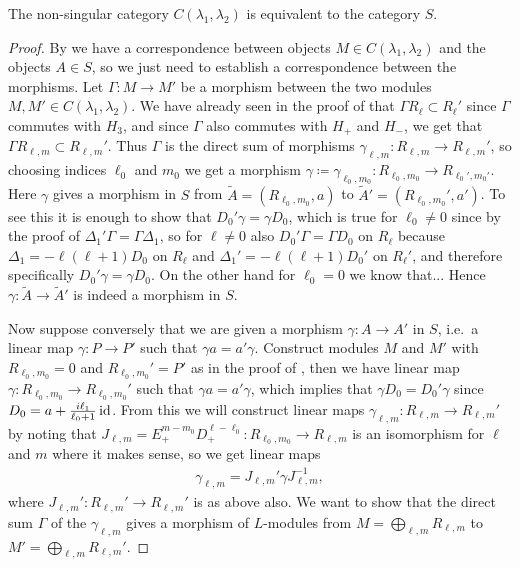 \begin{theorem}
  The non-singular category $C(\lambda_1,\lambda_2)$ is equivalent to the category $S$.
\end{theorem}
\begin{proof}
  By  we have a correspondence between objects $M\in C(\lambda_1,\lambda_2)$ and the objects $A\in S$, so we just need to establish a correspondence between the morphisms. Let $\Gamma\colon M\to M'$ be a morphism between the two modules $M,M'\in C(\lambda_1,\lambda_2)$. We have already seen in the proof of  that $\Gamma R_\ell\subset R_\ell'$ since $\Gamma$ commutes with $H_3$, and since $\Gamma$ also commutes with $H_+$ and $H_-$, we get that $\Gamma R_{\ell,m}\subset R_{\ell,m}'$. Thus $\Gamma$ is the direct sum of morphisms $\gamma_{\ell,m}\colon R_{\ell,m}\to R_{\ell,m}'$, so choosing indices $\ell_0$ and $m_0$ we get a morphism $\gamma\coloneqq \gamma_{\ell_0,m_0}\colon R_{\ell_0,m_0}\to R_{\ell_0',m_0'}$. Here $\gamma$ gives a morphism in $S$ from $\widetilde{A}=(R_{\ell_0,m_0},a)$ to $\widetilde{A}'=(R_{\ell_0,m_0}',a')$. To see this it is enough to show that $D_0'\gamma = \gamma D_0$, which is true for $\ell_0\neq0$ since by the proof of  $\Delta_1'\Gamma=\Gamma\Delta_1$, so for $\ell\neq 0$ also $D_0'\Gamma=\Gamma D_0$ on $R_\ell$ because $\Delta_1=-\ell(\ell+1)D_0$ on $R_\ell$ and $\Delta_1'=-\ell(\ell+1)D_0'$ on $R_\ell'$, and therefore specifically $D_0' \gamma = \gamma D_0$. On the other hand for $\ell_0=0$ we know that... Hence $\gamma\colon \widetilde{A}\to \widetilde{A}'$ is indeed a morphism in $S$.

  Now suppose conversely that we are given a morphism $\gamma\colon A\to A'$ in $S$, i.e.\ a linear map $\gamma\colon P\to P'$ such that $\gamma a=a'\gamma$. Construct modules $M$ and $M'$ with $R_{\ell_0,m_0}=0$ and $R_{\ell_0,m_0}'=P'$ as in the proof of , then we have linear map $\gamma\colon R_{\ell_0,m_0}\to R_{\ell_0,m_0}'$ such that $\gamma a=a'\gamma$, which implies that $\gamma D_0=D_0'\gamma$ since $D_0=a+\tfrac{i\ell_1}{\ell_0+1}\operatorname{id}$. From this we will construct linear maps $\gamma_{\ell,m}\colon R_{\ell,m}\to R_{\ell,m}'$ by noting that $J_{\ell,m}=E_+^{m-m_0}D_+^{\ell-\ell_0}\colon R_{\ell_0,m_0}\to R_{\ell,m}$ is an isomorphism for $\ell$ and $m$ where it makes sense, so we get linear maps
  \begin{align}\label{eq:tempgammalm}
    \gamma_{\ell,m} = J_{\ell,m}' \gamma J_{\ell,m}^{-1},
  \end{align}
  where $J_{\ell,m}'\colon R_{\ell,m}'\to R_{\ell,m}'$ is as above also. We want to show that the direct sum $\Gamma$ of the $\gamma_{\ell,m}$ gives a morphism of $L$-modules from $M=\bigoplus_{\ell,m} R_{\ell,m}$ to $M'=\bigoplus_{\ell,m} R_{\ell,m}'$. 


\end{proof}
